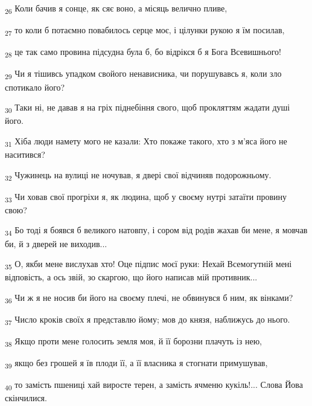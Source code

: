 \begin{tcolorbox}
\textsubscript{26} Коли бачив я сонце, як сяє воно, а місяць велично пливе,
\end{tcolorbox}
\begin{tcolorbox}
\textsubscript{27} то коли б потаємно повабилось серце моє, і цілунки рукою я їм посилав,
\end{tcolorbox}
\begin{tcolorbox}
\textsubscript{28} це так само провина підсудна була б, бо відрікся б я Бога Всевишнього!
\end{tcolorbox}
\begin{tcolorbox}
\textsubscript{29} Чи я тішивсь упадком свойого ненависника, чи порушувавсь я, коли зло спотикало його?
\end{tcolorbox}
\begin{tcolorbox}
\textsubscript{30} Таки ні, не давав я на гріх піднебіння свого, щоб прокляттям жадати душі його.
\end{tcolorbox}
\begin{tcolorbox}
\textsubscript{31} Хіба люди намету мого не казали: Хто покаже такого, хто з м'яса його не наситився?
\end{tcolorbox}
\begin{tcolorbox}
\textsubscript{32} Чужинець на вулиці не ночував, я двері свої відчиняв подорожньому.
\end{tcolorbox}
\begin{tcolorbox}
\textsubscript{33} Чи ховав свої прогріхи я, як людина, щоб у своєму нутрі затаїти провину свою?
\end{tcolorbox}
\begin{tcolorbox}
\textsubscript{34} Бо тоді я боявся б великого натовпу, і сором від родів жахав би мене, я мовчав би, й з дверей не виходив...
\end{tcolorbox}
\begin{tcolorbox}
\textsubscript{35} О, якби мене вислухав хто! Оце підпис моєї руки: Нехай Всемогутній мені відповість, а ось звій, зо скаргою, що його написав мій противник...
\end{tcolorbox}
\begin{tcolorbox}
\textsubscript{36} Чи ж я не носив би його на своєму плечі, не обвинувся б ним, як вінками?
\end{tcolorbox}
\begin{tcolorbox}
\textsubscript{37} Число кроків своїх я представлю йому; мов до князя, наближусь до нього.
\end{tcolorbox}
\begin{tcolorbox}
\textsubscript{38} Якщо проти мене голосить земля моя, й її борозни плачуть із нею,
\end{tcolorbox}
\begin{tcolorbox}
\textsubscript{39} якщо без грошей я їв плоди її, а її власника я стогнати примушував,
\end{tcolorbox}
\begin{tcolorbox}
\textsubscript{40} то замість пшениці хай виросте терен, а замість ячменю кукіль!... Слова Йова скінчилися.
\end{tcolorbox}
